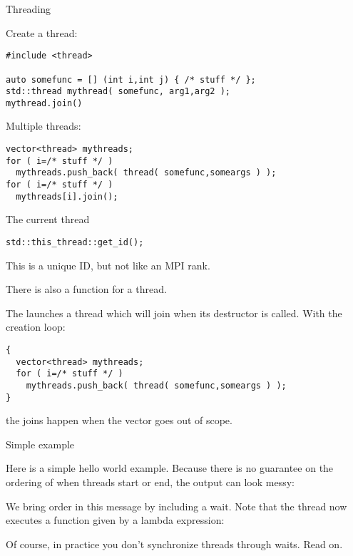 
 {Threading}

Create a thread:
\begin{lstlisting}
#include <thread>
  
auto somefunc = [] (int i,int j) { /* stuff */ };
std::thread mythread( somefunc, arg1,arg2 );
mythread.join()
\end{lstlisting}

Multiple threads:
\begin{lstlisting}
vector<thread> mythreads;
for ( i=/* stuff */ )
  mythreads.push_back( thread( somefunc,someargs ) );
for ( i=/* stuff */ )
  mythreads[i].join();
\end{lstlisting}

 {The current thread}
\label{sec:this-thread}

\begin{lstlisting}
std::this_thread::get_id();
\end{lstlisting}
This is a unique ID, but not like an MPI rank.

There is also a  function for a thread.

The   launches a thread
which will join when its destructor is called.
With the creation loop:
\begin{lstlisting}
{
  vector<thread> mythreads;
  for ( i=/* stuff */ )
    mythreads.push_back( thread( somefunc,someargs ) );
}
\end{lstlisting}
the joins happen when the vector goes out of scope.

 {Simple example}

Here is a simple hello world example.
Because there is no guarantee on the ordering of when threads
start or end, the output can look messy:
%

We bring order in this message by including a wait.
Note that the thread now executes a function
given by a lambda expression:
%

Of course, in practice you don't synchronize threads through waits.
Read on.

